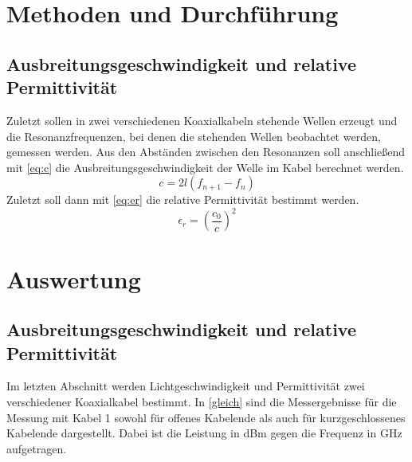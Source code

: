 \section{Methoden und Durchführung}
\subsection{Ausbreitungsgeschwindigkeit und relative Permittivität}
Zuletzt sollen in zwei verschiedenen Koaxialkabeln stehende Wellen erzeugt und die Resonanzfrequenzen, bei denen die stehenden Wellen beobachtet werden, gemessen werden. Aus den Abständen zwischen den Resonanzen soll anschließend mit \cref{eq:c} die Ausbreitungsgeschwindigkeit der Welle im Kabel berechnet werden.
\begin{equation}
	c = 2l(f_{n+1} - f_n)
	\label{eq:c}
\end{equation}
Zuletzt soll dann mit \cref{eq:er} die relative Permittivität bestimmt werden.
\begin{equation}
	\epsilon_r = \left( \frac{c_0}{c}\right) ^2
	\label{eq:er}
\end{equation}

\section{Auswertung}
\subsection{Ausbreitungsgeschwindigkeit und relative Permittivität}
Im letzten Abschnitt werden Lichtgeschwindigkeit und Permittivität zwei verschiedener Koaxialkabel bestimmt. In \cref{gleich} sind die Messergebnisse für die Messung mit Kabel 1 sowohl für offenes Kabelende als auch für kurzgeschlossenes Kabelende dargestellt. Dabei ist die Leistung in dBm gegen die Frequenz in GHz aufgetragen.